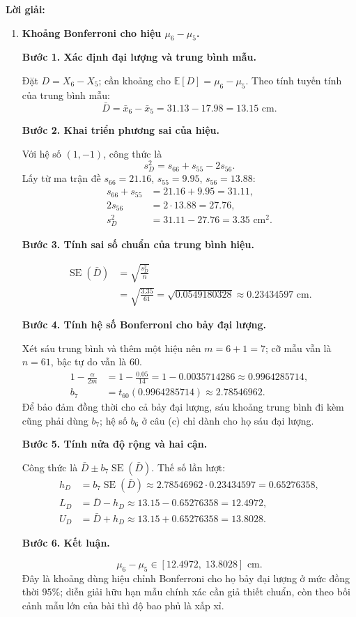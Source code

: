 \documentclass[11pt,a4paper]{article}
\newenvironment{solution}{%
  \par\medskip\noindent\textbf{Lời giải:}\par\nobreak\smallskip\noindent\ignorespaces
}{\par}
\newcommand{\answer}[1]{\boxed{#1}}
\newcommand{\step}[2]{\par\medskip\noindent\textbf{Bước #1. #2}\par\nopagebreak[4]\smallskip\noindent}
\begin{document}
\begin{solution}
\begin{enumerate}[label=\textbf{\alph*)}]
khi chỉ xét cặp này. Quan hệ bao hàm ở đây dành cho ellipse hai chiều
ở câu (b), không phải ellipse chiếu từ miền sáu chiều.
\item \textbf{Khoảng Bonferroni cho hiệu $\mu_6-\mu_5$.}\par\nopagebreak[4]
\step{1}{Xác định đại lượng và trung bình mẫu.}
Đặt $D=X_6-X_5$; cần khoảng cho $\mathbb{E}[D]=\mu_6-\mu_5$.
Theo tính tuyến tính của trung bình mẫu:
\[
\bar{D}=\bar{x}_6-\bar{x}_5=31.13-17.98=13.15\text{ cm}.
\]
\step{2}{Khai triển phương sai của hiệu.}
Với hệ số $(1,-1)$, công thức là
\[
s_D^2=s_{66}+s_{55}-2s_{56}.
\]
Lấy từ ma trận đề $s_{66}=21.16$, $s_{55}=9.95$, $s_{56}=13.88$:
\begin{align*}
s_{66}+s_{55}&=21.16+9.95=31.11,\\
2s_{56}&=2\cdot13.88=27.76,\\
s_D^2&=31.11-27.76=3.35\text{ cm}^2.
\end{align*}
\step{3}{Tính sai số chuẩn của trung bình hiệu.}
\begin{align*}
\operatorname{SE}(\bar{D})&=\sqrt{\frac{s_D^2}n}\\
&=\sqrt{\frac{3.35}{61}}=\sqrt{0.0549180328}
\approx0.23434597\text{ cm}.
\end{align*}
\step{4}{Tính hệ số Bonferroni cho bảy đại lượng.}
Xét sáu trung bình và thêm một hiệu nên $m=6+1=7$;
cỡ mẫu vẫn là $n=61$, bậc tự do vẫn là $60$.
\begin{align*}
1-\frac{\alpha}{2m}&=1-\frac{0.05}{14}
=1-0.0035714286\approx0.9964285714,\\
b_7&=t_{60}(0.9964285714)\approx2.78546962.
\end{align*}
Để bảo đảm đồng thời cho cả bảy đại lượng, sáu khoảng trung bình đi kèm
cũng phải dùng $b_7$; hệ số $b_6$ ở câu (c) chỉ dành cho họ sáu đại lượng.
\step{5}{Tính nửa độ rộng và hai cận.}
Công thức là $\bar{D}\pm b_7\operatorname{SE}(\bar{D})$.
Thế số lần lượt:
\begin{align*}
h_D&=b_7\operatorname{SE}(\bar{D})
\approx2.78546962\cdot0.23434597=0.65276358,\\
L_D&=\bar{D}-h_D\approx13.15-0.65276358=12.4972,\\
U_D&=\bar{D}+h_D\approx13.15+0.65276358=13.8028.
\end{align*}
\step{6}{Kết luận.}
\[
\answer{\mu_6-\mu_5\in[12.4972,\;13.8028]\text{ cm}}.
\]
Đây là khoảng dùng hiệu chỉnh Bonferroni cho họ bảy đại lượng ở mức
đồng thời $95\%$; diễn giải hữu hạn mẫu chính xác cần giả thiết chuẩn,
còn theo bối cảnh mẫu lớn của bài thì độ bao phủ là xấp xỉ.
\end{enumerate}
\end{solution}
\end{document}
